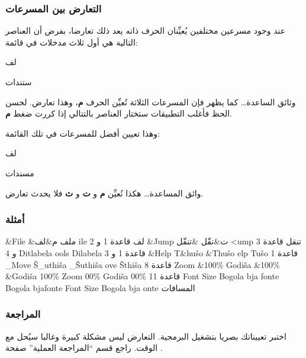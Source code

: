 \subsubsection{التعارض بين المسرعات}
عند وجود مسرعين مختلفين يُعيِّنان الحرف ذاته يعد ذلك تعارضا، بفرض أن
العناصر التالية هي أول ثلاث مدخلات في قائمة:

\startitemize[1]
\item {}لف
\item {}ستندات
\item وثائق الساعدة…
\stopitemize
كما يظهر فإن المسرعات الثلاثة تُعيِّن الحرف {\bf م}، وهذا تعارض. لحسن
الحظ فأغلب التطبيقات ستختار العناصر بالتتالي إذا كررت ضغط {\bf م}.

وهذا تعيين أفضل للمسرعات في تلك القائمة:

\startitemize[1]
\item {}لف
\item مسندات
\item وائق المساعدة…
\stopitemize
هكذا نُعيِّن {\bf م} و {\bf ت} و {\bf ث} فلا يحدث تعارض.

\subsubsection{أمثلة}
\starttable[|l|l|l|l|l|l|]
\HL
\NC {} \NC {}
\NC {} \NC {} \NC
{} \NC {}\NC\AR
\HL
\NC \&File \NC \&ملف \NC م\&لف \NC {}ile \NC {}لف
\NC قاعدة 1 و 2\NC\AR
\HL
\NC \&Jump \NC ت\&نقّل \NC \&تنقّل \NC {}<ump \NC تنقل \NC
قاعدة 3 و 4\NC\AR
\HL
\NC {}  \NC {} \NC {} Ditlabela \NC
{}ools \NC Dilabela \NC قاعدة 1 و 3\NC\AR
\HL
\NC \&Help \NC T\&hušo \NC \&Thušo \NC {}elp \NC
Tušo \NC قاعدة 1\NC\AR
\HL
\NC \_Move \NC Š\_uthiša \NC \_Šuthiša \NC {}ove \NC
Šthiša \NC قاعدة 8\NC\AR
\HL
\NC Zoom \&100\% \NC Godiša \&100\% \NC \&Godiša 100\% \NC Zoom
00\% \NC Godiša 00\% \NC قاعدة 11\NC\AR
\HL
\NC {} Font Size \NC Bogola bja  fonte \NC Bogola
bja fonte \NC Font Size \NC Bogola bja onte \NC
المسافات\NC\AR
\HL
\stoptable
\subsubsection{المراجعة}
اختبر تعييناتك بصريا بتشغيل البرمجية. التعارض ليس مشكلة كبيرة وغالبا
سيُحل مع الوقت. راجع قسم “المراجعة العملية” صفحة
\at[ref:34365426].

